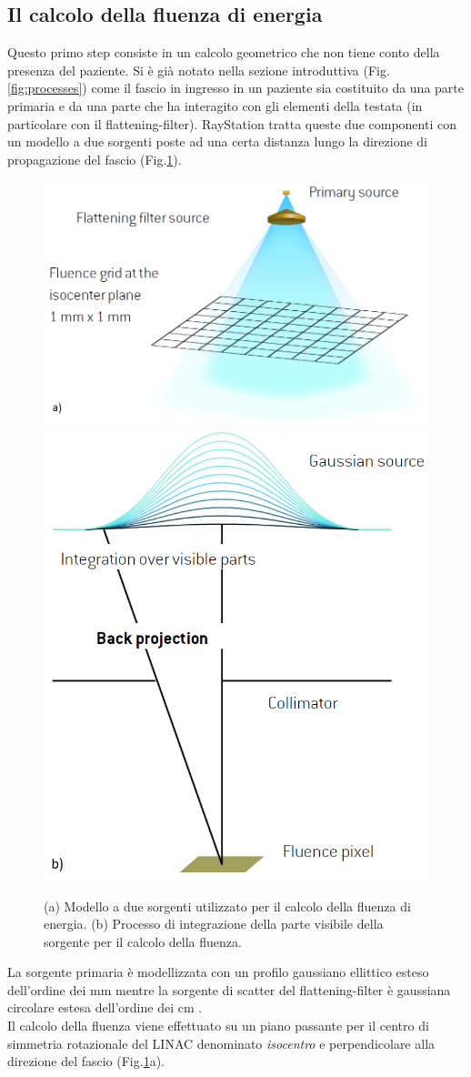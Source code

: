 {\subsection{Il calcolo della fluenza di energia}
\label{sec:fluence}
Questo primo step consiste in un calcolo geometrico che non tiene conto della presenza del paziente. Si è già notato nella sezione introduttiva (Fig.\ref{fig:processes}) come il fascio in ingresso in un paziente sia costituito da una parte primaria e da una parte che ha interagito con gli elementi della testata (in particolare con il flattening-filter). RayStation tratta queste due componenti con un modello a due sorgenti poste ad una certa distanza lungo la direzione di propagazione del fascio (Fig.\ref{fig:twosources}).
\begin{figure}
\centering
\includegraphics[width=.55\textwidth]{./cap1/twosources.png}
\includegraphics[width=.4\textwidth]{./cap1/source_int.png}
\caption{ (a) Modello a due sorgenti utilizzato per il calcolo della fluenza di energia. (b) Processo di integrazione della parte visibile della sorgente per il calcolo della fluenza.}
\label{fig:twosources}
\end{figure}
La sorgente primaria è modellizzata con un profilo gaussiano ellittico esteso dell'ordine dei mm mentre la sorgente di scatter del flattening-filter è gaussiana circolare estesa dell'ordine dei cm \cite{Chaney1994}.\\
Il calcolo della fluenza viene effettuato su un piano passante per il centro di simmetria rotazionale del LINAC denominato \textit{isocentro} e perpendicolare alla direzione del fascio (Fig.\ref{fig:twosources}a).
}
